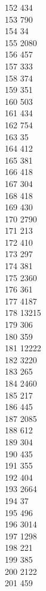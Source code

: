 { 152	434 \\
 153	790 \\
 154	34 \\
 155	2080 \\
 156	457 \\
 157	333 \\
 158	374 \\
 159	351 \\
 160	503 \\
 161	434 \\
 162	754 \\
 163	35 \\
 164	412 \\
 165	381 \\
 166	418 \\
 167	304 \\
 168	418 \\
 169	430 \\
 170	2790 \\
 171	213 \\
 172	410 \\
 173	297 \\
 174	381 \\
 175	2360 \\
 176	361 \\
 177	4187 \\
 178	13215 \\
 179	306 \\
 180	359 \\
 181	12222 \\
 182	3220 \\
 183	265 \\
 184	2460 \\
 185	217 \\
 186	445 \\
 187	2085 \\
 188	612 \\
 189	304 \\
 190	435 \\
 191	355 \\
 192	404 \\
 193	2664 \\
 194	37 \\
 195	496 \\
 196	3014 \\
 197	1298 \\
 198	221 \\
 199	385 \\
 200	2122 \\
 201	459 \\
}
